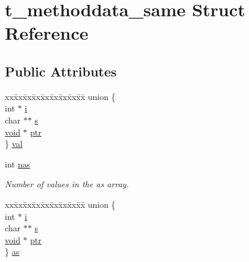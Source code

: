 \hypertarget{structt__methoddata__same}{\section{t\-\_\-methoddata\-\_\-same \-Struct \-Reference}
\label{structt__methoddata__same}
}
\subsection*{\-Public \-Attributes}
\begin{DoxyCompactItemize}
\item 
\begin{tabbing}
xx\=xx\=xx\=xx\=xx\=xx\=xx\=xx\=xx\=\kill
union \{\\
\>int $\ast$ \hyperlink{structt__methoddata__same_a041f9b3835ec6e385b114d41d98493a5}{i}\\
\>char $\ast$$\ast$ \hyperlink{structt__methoddata__same_adeb384c7870701e5e464333563e0927f}{s}\\
\>\hyperlink{nbnxn__kernel__simd__4xn__outer_8h_a8dc3f4a797ed992dff49d2fa3477eee8}{void} $\ast$ \hyperlink{structt__methoddata__same_a0ecb11cbe1431ed1cf7b1e106a0bd916}{ptr}\\
\} \hyperlink{structt__methoddata__same_a443d0d6fa094d20591db8b36b8439170}{val}\\

\end{tabbing}\item 
int \hyperlink{structt__methoddata__same_a16929969cd1a689be049f6a02eecfb5d}{nas}
\begin{DoxyCompactList}\small\item\em \-Number of values in the {\ttfamily as} array. \end{DoxyCompactList}\item 
\begin{tabbing}
xx\=xx\=xx\=xx\=xx\=xx\=xx\=xx\=xx\=\kill
union \{\\
\>int $\ast$ \hyperlink{structt__methoddata__same_a041f9b3835ec6e385b114d41d98493a5}{i}\\
\>char $\ast$$\ast$ \hyperlink{structt__methoddata__same_adeb384c7870701e5e464333563e0927f}{s}\\
\>\hyperlink{nbnxn__kernel__simd__4xn__outer_8h_a8dc3f4a797ed992dff49d2fa3477eee8}{void} $\ast$ \hyperlink{structt__methoddata__same_a0ecb11cbe1431ed1cf7b1e106a0bd916}{ptr}\\
\} \hyperlink{structt__methoddata__same_ad7602caa2309a42cb04e02acb68f3075}{as}\\


\end{tabbing}
\end{DoxyCompactItemize}
